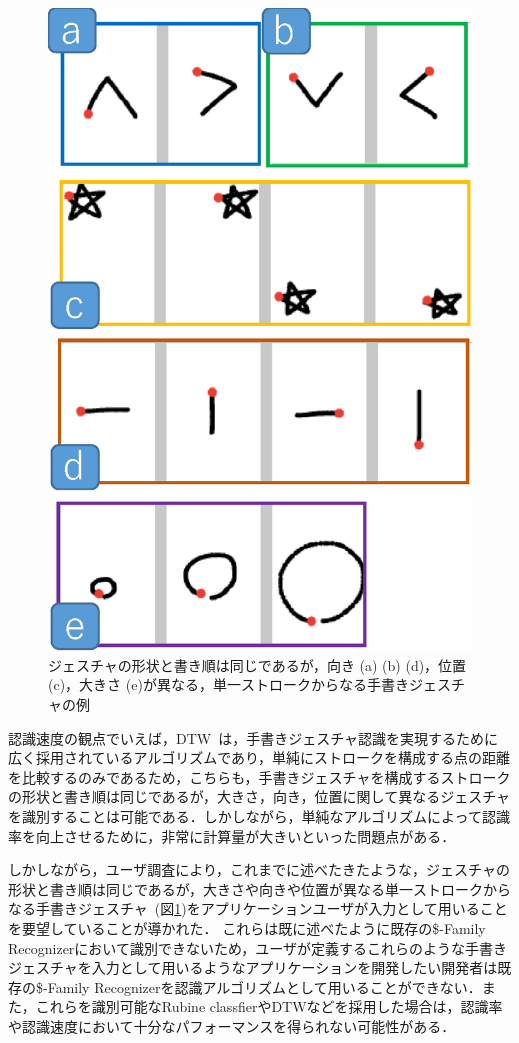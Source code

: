 \begin{figure} [htbp]
\centering
\includegraphics [width=0.5\columnwidth]{img/examples_V.eps}
\caption{ジェスチャの形状と書き順は同じであるが，向き (a) (b) (d)，位置 (c)，大きさ (e)が異なる，単一ストロークからなる手書きジェスチャの例}
\label{fig:examples_V}
\end{figure}


認識速度の観点でいえば，DTW~\cite{Tappert:1982:CSR:1664966.1664979, Salvador:2007:TAD:1367985.1367993}は，手書きジェスチャ認識を実現するために広く採用されているアルゴリズムであり，単純にストロークを構成する点の距離を比較するのみであるため，こちらも，手書きジェスチャを構成するストロークの形状と書き順は同じであるが，大きさ，向き，位置に関して異なるジェスチャを識別することは可能である．しかしながら，単純なアルゴリズムによって認識率を向上させるために，非常に計算量が大きいといった問題点がある．

しかしながら，ユーザ調査により，これまでに述べたきたような，ジェスチャの形状と書き順は同じであるが，大きさや向きや位置が異なる単一ストロークからなる手書きジェスチャ~(図\ref{fig:examples_V})をアプリケーションユーザが入力として用いることを要望していることが導かれた．
これらは既に述べたように既存の\$-Family Recognizerにおいて識別できないため，ユーザが定義するこれらのような手書きジェスチャを入力として用いるようなアプリケーションを開発したい開発者は既存の\$-Family Recognizerを認識アルゴリズムとして用いることができない．また，これらを識別可能なRubine classfierやDTWなどを採用した場合は，認識率や認識速度において十分なパフォーマンスを得られない可能性がある．


